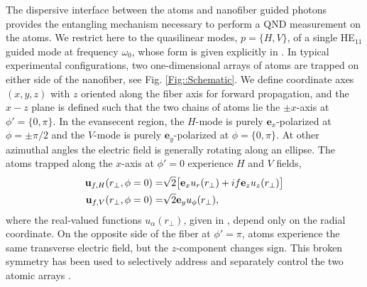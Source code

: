 \documentclass[aps,pra,twocolumn]{revtex4-1} %
\begin{document}
The dispersive interface between the atoms and nanofiber guided photons provides the entangling mechanism necessary to perform a QND measurement on the atoms.  
We restrict here to the quasilinear modes, $p =\{H,V\}$, of a single HE$_{11}$ guided mode at frequency $\omega_0$, whose form is given explicitly in .  
In typical experimental configurations, two one-dimensional arrays of atoms are trapped on either side of the nanofiber, see Fig. \ref{Fig::Schematic}. 
We define coordinate axes $(x,y,z)$ with $z$ oriented along the fiber axis for forward propagation, and the $x-z$ plane is defined such that the two chains of atoms lie the $\pm x$-axis at $\phi' = \{0, \pi\}$.
In the evansecent region, the $H$-mode is purely $\mathbf{e}_x$-polarized at $\phi = \pm \pi/2$ and the $V$-mode is purely $\mathbf{e}_y$-polarized at $\phi = \{0,\pi\}$.  
At other azimuthal angles the electric field is generally rotating along an ellipse.  The atoms trapped along the $x$-axis at $\phi'=0$ experience $H$ and $V$ fields,
	\begin{align}
		\mathbf{u}_{f,H}(r_\perp, \phi = 0) = & \sqrt{2} \big[ \mathbf{e}_x u_r(r_\perp)+  if \mathbf{e}_z  u_z(r_\perp) \big] \\
		\mathbf{u}_{f,V}(r_\perp, \phi = 0) = & \sqrt{2} \mathbf{e}_y u_\phi(r_\perp), 
	\end{align}
where the real-valued functions $u_\alpha(r_\perp)$, given in , depend only on the radial coordinate.  
On the opposite side of the fiber at $\phi' = \pi$, atoms experience the same transverse electric field, but the $z$-component changes sign.   This broken symmetry has been used to selectively address and separately control the two atomic arrays \cite{mitsch_exploiting_2014, mitsch_quantum_2014, sayrin_storage_2015}.  
\end{document}
